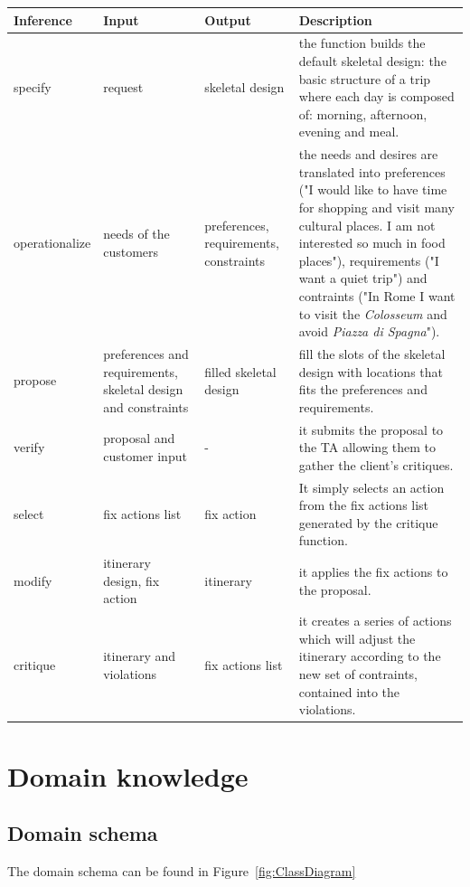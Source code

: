 \documentclass[11pt]{article} %
\begin{document}
\noindent
\begin{tabular}{|p{2.5cm}|p{2.5cm}|p{3cm}|p{6cm}|}
  \hline
Inference		& Input	& Output 	& Description \\ \hline \hline
specify		& request	& skeletal design		& the function builds the default skeletal design: the basic structure of a trip where each day is composed of: morning, afternoon, evening and meal.
\\ \hline 
   operationalize	& needs of the customers		& preferences, requirements, constraints	& the needs and desires are translated into preferences ("I would like to have time for shopping and visit many cultural places. I am not interested so much in food places"), requirements ("I want a quiet trip") and contraints ("In Rome I want to visit the \emph{Colosseum} and avoid \emph{Piazza di Spagna}"). 
\\ \hline
propose	& preferences and requirements, skeletal design and constraints		& filled skeletal design	& fill the slots of the skeletal design with locations that fits the preferences and requirements.
\\
\hline
verify		& proposal and customer input	& -	& it submits the proposal to the TA allowing them to gather the client's critiques.
\\ \hline
select 	& fix actions list		& fix action		& It simply selects an action from the fix actions list generated by the critique function.
\\ \hline
modify	& itinerary design, fix action		& itinerary		& it applies the fix actions to the proposal.
\\ \hline
critique	& itinerary and violations	& fix actions list		& it creates a series of actions which will adjust the itinerary according to the new set of contraints, contained into the violations.
\\ \hline
\end{tabular}

\clearpage
\section{Domain knowledge}

\subsection{Domain schema} \label{sec:domain}
The domain schema can be found in Figure~\ref{fig:ClassDiagram}
\end{document}
